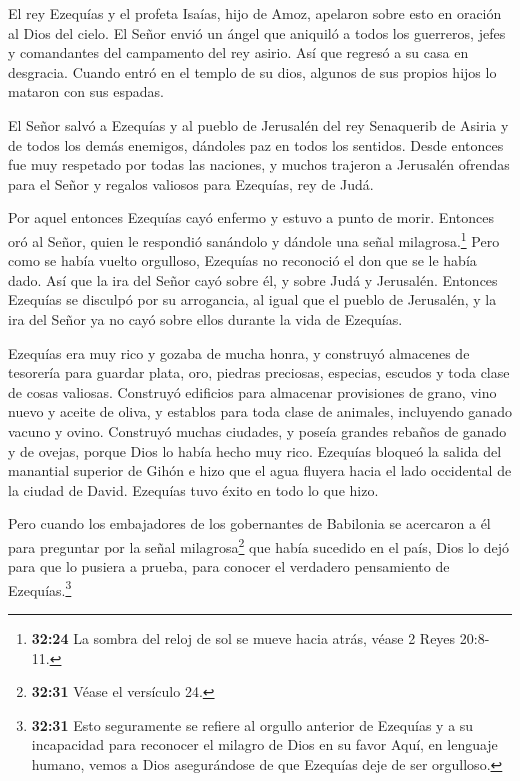  El rey Ezequías y el profeta Isaías, hijo de Amoz,
apelaron sobre esto en oración al Dios del cielo.  El Señor
envió un ángel que aniquiló a todos los guerreros, jefes y comandantes
del campamento del rey asirio. Así que regresó a su casa en desgracia.
Cuando entró en el templo de su dios, algunos de sus propios hijos lo
mataron con sus espadas.

 El Señor salvó a Ezequías y al pueblo de Jerusalén del rey
Senaquerib de Asiria y de todos los demás enemigos, dándoles paz en
todos los sentidos.  Desde entonces fue muy respetado por
todas las naciones, y muchos trajeron a Jerusalén ofrendas para el Señor
y regalos valiosos para Ezequías, rey de Judá.

 Por aquel entonces Ezequías cayó enfermo y estuvo a punto
de morir. Entonces oró al Señor, quien le respondió sanándolo y dándole
una señal milagrosa.\footnote{\textbf{32:24} La sombra del reloj de sol
  se mueve hacia atrás, véase 2 Reyes 20:8-11.}  Pero como
se había vuelto orgulloso, Ezequías no reconoció el don que se le había
dado. Así que la ira del Señor cayó sobre él, y sobre Judá y Jerusalén.
 Entonces Ezequías se disculpó por su arrogancia, al igual
que el pueblo de Jerusalén, y la ira del Señor ya no cayó sobre ellos
durante la vida de Ezequías.

 Ezequías era muy rico y gozaba de mucha honra, y construyó
almacenes de tesorería para guardar plata, oro, piedras preciosas,
especias, escudos y toda clase de cosas valiosas. 
Construyó edificios para almacenar provisiones de grano, vino nuevo y
aceite de oliva, y establos para toda clase de animales, incluyendo
ganado vacuno y ovino.  Construyó muchas ciudades, y poseía
grandes rebaños de ganado y de ovejas, porque Dios lo había hecho muy
rico.  Ezequías bloqueó la salida del manantial superior de
Gihón e hizo que el agua fluyera hacia el lado occidental de la ciudad
de David. Ezequías tuvo éxito en todo lo que hizo.

 Pero cuando los embajadores de los gobernantes de
Babilonia se acercaron a él para preguntar por la señal
milagrosa\footnote{\textbf{32:31} Véase el versículo 24.} que había
sucedido en el país, Dios lo dejó para que lo pusiera a prueba, para
conocer el verdadero pensamiento de Ezequías.\footnote{\textbf{32:31}
  Esto seguramente se refiere al orgullo anterior de Ezequías y a su
  incapacidad para reconocer el milagro de Dios en su favor Aquí, en
  lenguaje humano, vemos a Dios asegurándose de que Ezequías deje de ser
  orgulloso.}

